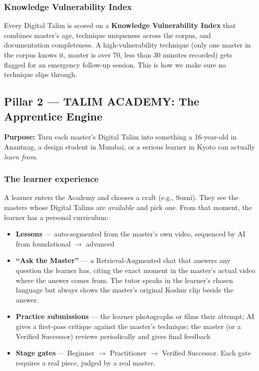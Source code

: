 \documentclass[11pt, a4paper]{article}
\begin{document}
\subsubsection{Knowledge Vulnerability Index}

Every Digital Talim is scored on a {\bfseries Knowledge Vulnerability Index} that combines master's age, technique uniqueness across the corpus, and documentation completeness. A high-vulnerability technique (only one master in the corpus knows it, master is over 70, less than 30 minutes recorded) gets flagged for an emergency follow-up session. This is how we make sure no technique slips through.

\subsection{Pillar 2 — TALIM ACADEMY: The Apprentice Engine}

\textbf{Purpose:} Turn each master's Digital Talim into something a 16-year-old in Anantnag, a design student in Mumbai, or a serious learner in Kyoto can actually \textit{learn from}.

\subsubsection{The learner experience}

A learner enters the Academy and chooses a craft (e.g., Sozni). They see the masters whose Digital Talims are available and pick one. From that moment, the learner has a personal curriculum:

\begin{itemize}
  \item \textbf{Lessons} — auto-segmented from the master's own video, sequenced by AI from foundational $\to$ advanced
  \item \textbf{``Ask the Master''} — a Retrieval-Augmented chat that answers any question the learner has, citing the exact moment in the master's actual video where the answer comes from. The tutor speaks in the learner's chosen language but always shows the master's original Koshur clip beside the answer.
  \item \textbf{Practice submissions} — the learner photographs or films their attempt; AI gives a first-pass critique against the master's technique; the master (or a Verified Successor) reviews periodically and gives final feedback
  \item \textbf{Stage gates} — Beginner $\to$ Practitioner $\to$ Verified Successor. Each gate requires a real piece, judged by a real master.
\end{itemize}
\end{document}
